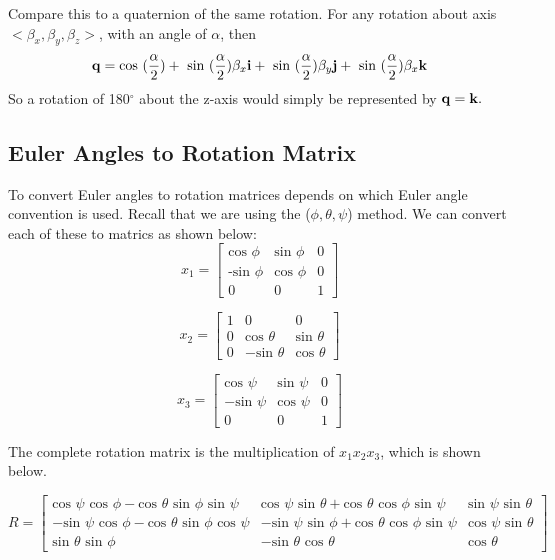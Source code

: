 Compare this to a quaternion of the same rotation.
For any rotation about axis $<\beta_x, \beta_y, \beta_z>$, with an angle of $\alpha$, then $$ \text{\textbf{q}} = \text{cos }(\frac{\alpha}{2}) + \text{ sin }(\frac{\alpha}{2})\beta_x\text{\textbf{i}} + \text{ sin }(\frac{\alpha}{2})\beta_y\text{\textbf{j}} + \text{ sin }(\frac{\alpha}{2}) \beta_x\text{\textbf{k}} $$
So a rotation of 180$^\circ$ about the z-axis would simply be represented by $\text{\textbf{q}} = \text{\textbf{k}}.$

\subsection{Euler Angles to Rotation Matrix}
To convert Euler angles to rotation matrices depends on which Euler angle convention is used.
Recall that we are using the ($\phi, \theta, \psi$) method.
We can convert each of these to matrics as shown below:
$$
x_1 =
\begin{bmatrix}
\text{cos }\phi & \text{sin } \phi & 0 \\
\text{-sin }\phi & \text{cos }\phi & 0 \\
0 & 0 & 1
\end{bmatrix}
$$

$$
x_2 =
\begin{bmatrix}
1 & 0 & 0 \\
0 & \text{cos } \theta & \text{sin } \theta \\
0 & -\text{sin } \theta & \text{cos } \theta
\end{bmatrix}
$$

$$
x_3 =
\begin{bmatrix}
\text{cos } \psi & \text{sin } \psi & 0 \\
- \text{sin } \psi & \text{cos } \psi & 0 \\
0 & 0 & 1
\end{bmatrix}
$$

The complete rotation matrix is the multiplication of $x_1x_2x_3$, which is shown below.

$$
R =
\begin{bmatrix}
\text{cos }\psi \text{ cos }\phi- \text{cos }\theta \text{ sin }\phi \text{ sin }\psi & \text{cos } \psi \text{ sin }\theta + \text{cos }\theta \text{ cos }\phi \text{ sin }\psi & \text{sin }\psi \text{ sin }\theta \\
-\text{sin }\psi \text{ cos }\phi - \text{cos }\theta \text{ sin }\phi \text{ cos }\psi & - \text{sin }\psi \text{ sin }\phi + \text{cos }\theta \text{ cos }\phi \text{ sin }\psi & \text{cos }\psi \text{ sin }\theta \\
\text{sin }\theta \text{ sin }\phi & - \text{sin }\theta \text{ cos }\theta & \text{cos } \theta
\end{bmatrix}
$$

